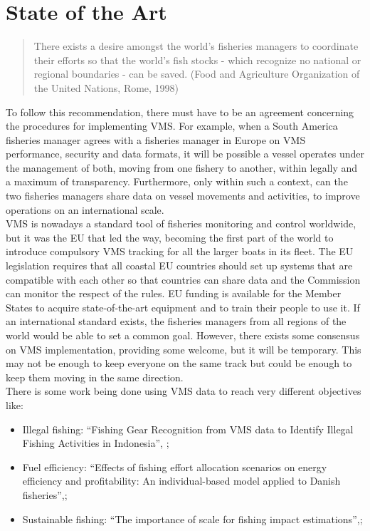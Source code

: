 

% 
%  
%
\chapter{State of the Art}
\label{cha:state_of_the_art}

\begin{quotation}
There exists a desire amongst the world’s fisheries managers to coordinate their efforts so that the world’s fish stocks - which recognize no national or regional boundaries - can be saved. \hfill (Food and Agriculture Organization of the United Nations, Rome, 1998)
\end{quotation}


To follow this recommendation, there must have to be an agreement concerning the procedures for implementing VMS. For example, when a South America fisheries manager agrees with a fisheries manager in Europe on VMS performance, security and data formats, it will be possible a vessel operates under the management of both, moving from one fishery to another, within legally and a maximum of transparency. Furthermore, only within such a context, can the two fisheries managers share data on vessel movements and activities, to improve operations on an international scale.\\
VMS is nowadays a standard tool of fisheries monitoring and control worldwide, but it was the EU that led the way, becoming the first part of the world to introduce compulsory VMS tracking for all the larger boats in its fleet. The EU legislation requires that all coastal EU countries should set up systems that are compatible with each other so that countries can share data and the Commission can monitor the respect of the rules. EU funding is available for the Member States to acquire state-of-the-art equipment and to train their people to use it. \cite{WEBSITE:EuropeanCommissionVMS}
If an international standard exists, the fisheries managers from all regions of the world would be able to set a common goal. However, there exists some consensus on VMS implementation, providing some welcome, but it will be temporary. This may not be enough to keep everyone on the same track but could be enough to keep them moving in the same direction.\\

There is some work being done using VMS data to reach very different objectives like:
\begin{itemize}
\item    Illegal fishing: “Fishing Gear Recognition from VMS data to Identify Illegal Fishing Activities in Indonesia”, \cite{MarzukiIllegalFishing};
\item    Fuel efficiency: “Effects of fishing effort allocation scenarios on energy efficiency and profitability: An individual-based model applied to Danish fisheries”,\cite{BastardieFishingEfficiency};
\item    Sustainable fishing: “The importance of scale for fishing impact estimations”,\cite{QuirijnsImportanceImpact};
\end{itemize}

